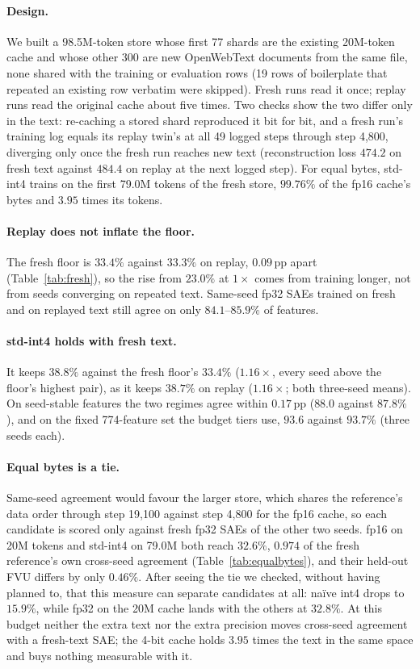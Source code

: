 \documentclass{article}
\begin{document}
\paragraph{Design.} We built a 98.5M-token store whose first 77 shards
are the existing 20M-token cache and whose other 300 are new OpenWebText
documents from the same file, none shared with the training or
evaluation rows (19 rows of boilerplate that repeated an existing row
verbatim were skipped). Fresh runs read it once; replay runs read the
original cache about five times. Two checks show the two differ only in
the text: re-caching a stored shard reproduced it bit for bit, and a
fresh run's training log equals its replay twin's at all 49 logged
steps through step 4,800, diverging only once the fresh run reaches new
text (reconstruction loss $474.2$ on fresh text against $484.4$ on
replay at the next logged step). For equal bytes, std-int4 trains on the first 79.0M tokens of
the fresh store, $99.76\%$ of the fp16 cache's bytes and $3.95$ times
its tokens.

\paragraph{Replay does not inflate the floor.} The fresh floor is
$33.4\%$ against $33.3\%$ on replay, $0.09$\,pp apart
(Table~\ref{tab:fresh}), so the rise from $23.0\%$ at $1\times$ comes
from training longer, not from seeds converging on repeated text.
Same-seed fp32 SAEs trained on fresh and on replayed text still agree
on only $84.1$--$85.9\%$ of features.

\paragraph{std-int4 holds with fresh text.} It keeps $38.8\%$ against
the fresh floor's $33.4\%$ ($1.16\times$, every seed above the floor's
highest pair), as it keeps $38.7\%$ on replay ($1.16\times$; both
three-seed means). On seed-stable features the two regimes agree within
$0.17$\,pp ($88.0$ against $87.8\%$), and on the fixed 774-feature set
the budget tiers use, $93.6$ against $93.7\%$ (three seeds each).

\paragraph{Equal bytes is a tie.} Same-seed agreement would favour the
larger store, which shares the reference's data order through step
19,100 against step 4,800 for the fp16 cache, so each candidate is
scored only against fresh fp32 SAEs of the other two seeds. fp16 on 20M
tokens and std-int4 on 79.0M both reach $32.6\%$, $0.974$ of the
fresh reference's own cross-seed agreement (Table~\ref{tab:equalbytes}),
and their held-out FVU differs by only $0.46\%$. After seeing the tie
we checked, without having planned to, that this measure can separate
candidates at all: na\"ive int4 drops to $15.9\%$, while fp32 on the
20M cache lands with the others at $32.8\%$. At this budget neither the
extra text nor the extra precision moves cross-seed agreement with a
fresh-text SAE; the 4-bit cache holds $3.95$ times the text in the same
space and buys nothing measurable with it.
\end{document}
